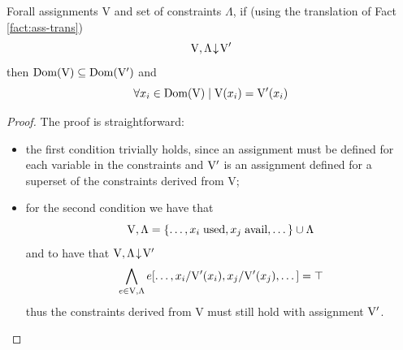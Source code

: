 \documentclass[a4paper, 12pt, english]{report}
\begin{document}
\begin{lemma}
	\label{lemma:constr}
	Forall assignments V and set of constraints $\Lambda$, if (using the translation of Fact \ref{fact:ass-trans})
	$$ \mathrm{V}, \Lambda\!\downarrow\!\mathrm{V}' $$
	then $\text{Dom}(\mathrm{V}) \subseteq \text{Dom}(\mathrm{V}')$ and
	$$ \forall x_i \in \text{Dom}(\mathrm{V}) \mid \mathrm{V}(x_i) = \mathrm{V}'(x_i) $$
\end{lemma}
\begin{proof}
	The proof is straightforward: 
	\begin{itemize}
		\item the first condition trivially holds, since an assignment must be defined for each variable in the constraints and $\mathrm{V}'$ is an assignment defined for a superset of the constraints derived from V;
		\item for the second condition we have that
			$$ \mathrm{V}, \Lambda = \{ \dots, x_i \; \text{used}, x_j \; \text{avail}, \dots \} \cup \Lambda $$
		and to have that $ \mathrm{V}, \Lambda\!\downarrow\!\mathrm{V}' $
			$$ \bigwedge_{e \in \mathrm{V}, \Lambda} e[\dots, x_i / \mathrm{V}'(x_i), x_j / \mathrm{V}'(x_j), \dots] = \top $$
		thus the constraints derived from V must still hold with assignment $\mathrm{V}'$.
	\end{itemize}
	
\end{proof}
\end{document}
